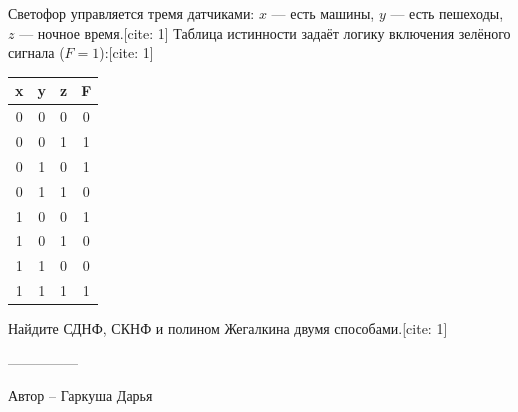 \question

Светофор управляется тремя датчиками: $x$ — есть машины, $y$ — есть пешеходы, $z$ — ночное время.[cite: 1] Таблица истинности задаёт логику включения зелёного сигнала ($F = 1$):[cite: 1]

\begin{center}
\begin{tabular}{|c|c|c|c|}
\hline
\textbf{x} & \textbf{y} & \textbf{z} & \textbf{F} \\
\hline
0 & 0 & 0 & 0 \\
0 & 0 & 1 & 1 \\
0 & 1 & 0 & 1 \\
0 & 1 & 1 & 0 \\
1 & 0 & 0 & 1 \\
1 & 0 & 1 & 0 \\
1 & 1 & 0 & 0 \\
1 & 1 & 1 & 1 \\
\hline
\end{tabular}
\end{center}

Найдите СДНФ, СКНФ и полином Жегалкина двумя способами.[cite: 1]

---------------

Автор -- Гаркуша Дарья